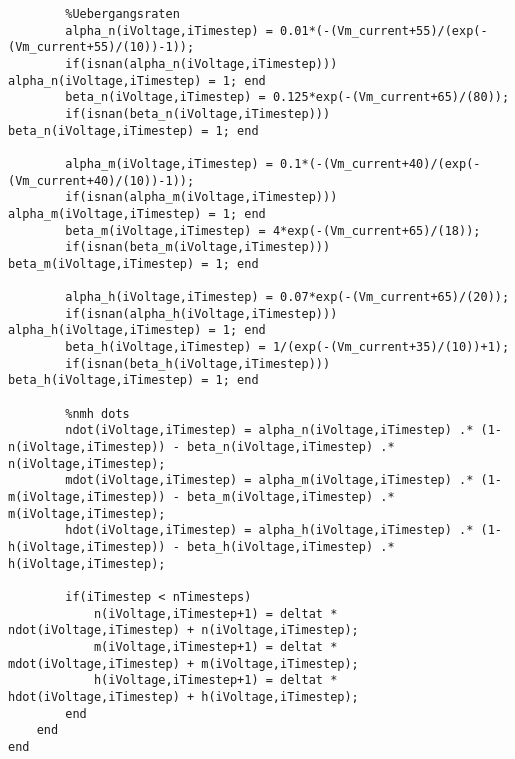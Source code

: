 \documentclass[12pt,a4paper,noendnumber=true]{scrartcl}
\begin{document}
\begin{lstlisting}
		%Uebergangsraten
		alpha_n(iVoltage,iTimestep) = 0.01*(-(Vm_current+55)/(exp(-(Vm_current+55)/(10))-1));
		if(isnan(alpha_n(iVoltage,iTimestep))) alpha_n(iVoltage,iTimestep) = 1; end
		beta_n(iVoltage,iTimestep) = 0.125*exp(-(Vm_current+65)/(80));
		if(isnan(beta_n(iVoltage,iTimestep))) beta_n(iVoltage,iTimestep) = 1; end
		
		alpha_m(iVoltage,iTimestep) = 0.1*(-(Vm_current+40)/(exp(-(Vm_current+40)/(10))-1));
		if(isnan(alpha_m(iVoltage,iTimestep))) alpha_m(iVoltage,iTimestep) = 1; end
		beta_m(iVoltage,iTimestep) = 4*exp(-(Vm_current+65)/(18));
		if(isnan(beta_m(iVoltage,iTimestep))) beta_m(iVoltage,iTimestep) = 1; end
		
		alpha_h(iVoltage,iTimestep) = 0.07*exp(-(Vm_current+65)/(20));
		if(isnan(alpha_h(iVoltage,iTimestep))) alpha_h(iVoltage,iTimestep) = 1; end
		beta_h(iVoltage,iTimestep) = 1/(exp(-(Vm_current+35)/(10))+1);
		if(isnan(beta_h(iVoltage,iTimestep))) beta_h(iVoltage,iTimestep) = 1; end
		
		%nmh dots
		ndot(iVoltage,iTimestep) = alpha_n(iVoltage,iTimestep) .* (1-n(iVoltage,iTimestep)) - beta_n(iVoltage,iTimestep) .* n(iVoltage,iTimestep);
		mdot(iVoltage,iTimestep) = alpha_m(iVoltage,iTimestep) .* (1-m(iVoltage,iTimestep)) - beta_m(iVoltage,iTimestep) .* m(iVoltage,iTimestep);
		hdot(iVoltage,iTimestep) = alpha_h(iVoltage,iTimestep) .* (1-h(iVoltage,iTimestep)) - beta_h(iVoltage,iTimestep) .* h(iVoltage,iTimestep);
		
		if(iTimestep < nTimesteps)
			n(iVoltage,iTimestep+1) = deltat * ndot(iVoltage,iTimestep) + n(iVoltage,iTimestep);
			m(iVoltage,iTimestep+1) = deltat * mdot(iVoltage,iTimestep) + m(iVoltage,iTimestep);
			h(iVoltage,iTimestep+1) = deltat * hdot(iVoltage,iTimestep) + h(iVoltage,iTimestep);
		end    
	end
end

\end{lstlisting}
\end{document}
